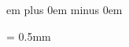 \newskip\beforeinitialshift
{} em plus 0em minus 0em


\newdimen\aboveinitialseparation
\aboveinitialseparation = 0.5mm

\def\setaboveinitialseparation#1{
\aboveinitialseparation=#1%
\relax %
}

\def\setspaceafterinitial#1{%
\afterinitialshift=#1 %
\relax %
}

\def\setspacebeforeinitial#1{%
\beforeinitialshift=#1 %
\relax %
}

\newskip\clefchangespace

